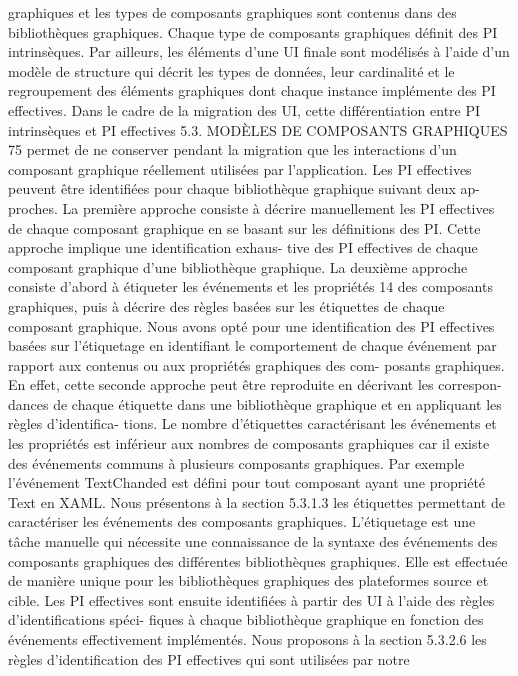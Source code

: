 \documentclass{article}
\begin{document}
graphiques et les types de composants graphiques sont contenus dans des bibliothèques graphiques.
Chaque type de composants graphiques déﬁnit des PI intrinsèques. Par ailleurs, les éléments d’une UI
ﬁnale sont modélisés à l’aide d’un modèle de structure qui décrit les types de données, leur cardinalité
et le regroupement des éléments graphiques dont chaque instance implémente des PI effectives.
Dans le cadre de la migration des UI, cette différentiation entre PI intrinsèques et PI effectives
5.3. MODÈLES DE COMPOSANTS GRAPHIQUES
75
permet de ne conserver pendant la migration que les interactions d’un composant graphique réellement
utilisées par l’application.
Les PI effectives peuvent être identiﬁées pour chaque bibliothèque graphique suivant deux ap-
proches. La première approche consiste à décrire manuellement les PI effectives de chaque composant
graphique en se basant sur les déﬁnitions des PI. Cette approche implique une identiﬁcation exhaus-
tive des PI effectives de chaque composant graphique d’une bibliothèque graphique. La deuxième
approche consiste d’abord à étiqueter les événements et les propriétés 14 des composants graphiques,
puis à décrire des règles basées sur les étiquettes de chaque composant graphique.
Nous avons opté pour une identiﬁcation des PI effectives basées sur l’étiquetage en identiﬁant le
comportement de chaque événement par rapport aux contenus ou aux propriétés graphiques des com-
posants graphiques. En effet, cette seconde approche peut être reproduite en décrivant les correspon-
dances de chaque étiquette dans une bibliothèque graphique et en appliquant les règles d’identiﬁca-
tions. Le nombre d’étiquettes caractérisant les événements et les propriétés est inférieur aux nombres
de composants graphiques car il existe des événements communs à plusieurs composants graphiques.
Par exemple l’événement TextChanded est déﬁni pour tout composant ayant une propriété Text en
XAML. Nous présentons à la section 5.3.1.3 les étiquettes permettant de caractériser les événements
des composants graphiques. L’étiquetage est une tâche manuelle qui nécessite une connaissance de la
syntaxe des événements des composants graphiques des différentes bibliothèques graphiques. Elle est
effectuée de manière unique pour les bibliothèques graphiques des plateformes source et cible.
Les PI effectives sont ensuite identiﬁées à partir des UI à l’aide des règles d’identiﬁcations spéci-
ﬁques à chaque bibliothèque graphique en fonction des événements effectivement implémentés. Nous
proposons à la section 5.3.2.6 les règles d’identiﬁcation des PI effectives qui sont utilisées par notre
\end{document}

